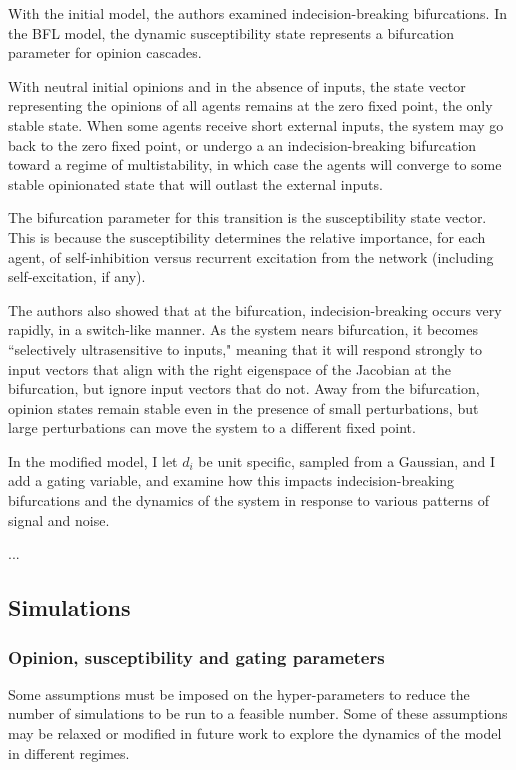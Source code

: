 \documentclass[]{article}
\begin{document}
With the initial model, the authors examined indecision-breaking bifurcations. In the BFL model, the dynamic susceptibility state represents a bifurcation parameter for opinion cascades. 

With neutral initial opinions and in the absence of inputs, the state vector representing the opinions of all agents remains at the zero fixed point, the only stable state. When some agents receive short external inputs, the system may go back to the zero fixed point, or undergo a an indecision-breaking bifurcation toward a regime of multistability, in which case the agents will converge to some stable opinionated state that will outlast the external inputs. 

The bifurcation parameter for this transition is the susceptibility state vector. This is because the susceptibility determines the relative importance, for each agent, of self-inhibition versus recurrent excitation from the network (including self-excitation, if any).

The authors also showed that at the bifurcation, indecision-breaking occurs very rapidly, in a switch-like manner. As the system nears bifurcation, it becomes ``selectively ultrasensitive to inputs," meaning that it will respond strongly to input vectors that align with the right eigenspace of the Jacobian at the bifurcation, but ignore input vectors that do not. Away from the bifurcation, opinion states remain stable even in the presence of small perturbations, but large perturbations can move the system to a different fixed point.

In the modified model, I let $d_i$ be unit specific, sampled from a Gaussian, and I add a gating variable, and examine how this impacts indecision-breaking bifurcations and the dynamics of the system in response to various patterns of signal and noise. 

...

\subsection{Simulations}

\subsubsection{Opinion, susceptibility and gating parameters}

Some assumptions must be imposed on the hyper-parameters to reduce the number of simulations to be run to a feasible number. Some of these assumptions may be relaxed or modified in future work to explore the dynamics of the model in different regimes.
\end{document}
